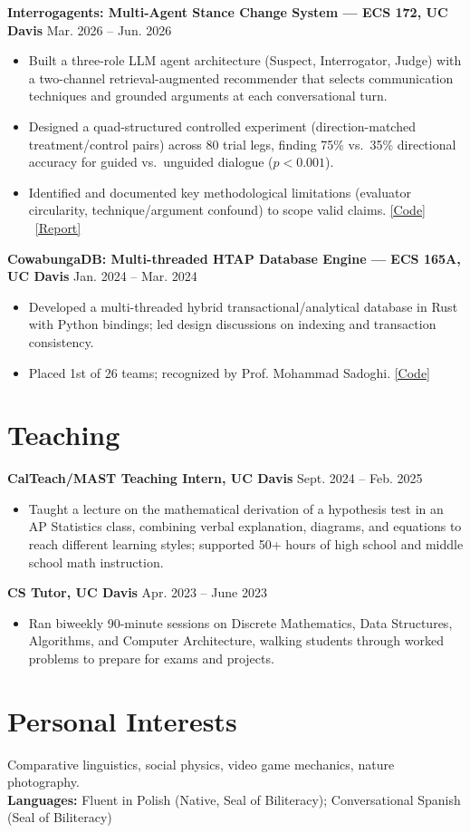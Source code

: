 \documentclass[10.5pt]{article}
\newcommand{\entry}[2]{\textbf{#1} \hfill #2\\}
\begin{document}
\entry{Interrogagents: Multi-Agent Stance Change System --- ECS 172, UC Davis}{Mar. 2026 -- Jun. 2026}
\begin{itemize}
  \item Built a three-role LLM agent architecture (Suspect, Interrogator, Judge) with a two-channel retrieval-augmented recommender that selects communication techniques and grounded arguments at each conversational turn.
  \item Designed a quad-structured controlled experiment (direction-matched treatment/control pairs) across 80 trial legs, finding 75\% vs.\ 35\% directional accuracy for guided vs.\ unguided dialogue ($p < 0.001$).
  \item Identified and documented key methodological limitations (evaluator circularity, technique/argument confound) to scope valid claims. \href{https://github.com/mawroblewski1/interrogating-agents}{[Code]} \textbar\ \href{https://github.com/mawroblewski1/interrogating-agents/blob/main/papers/project_report.pdf}{[Report]}
\end{itemize}

\entry{CowabungaDB: Multi-threaded HTAP Database Engine --- ECS 165A, UC Davis}{Jan. 2024 -- Mar. 2024}
\begin{itemize}
  \item Developed a multi-threaded hybrid transactional/analytical database in Rust with Python bindings; led design discussions on indexing and transaction consistency.
  \item Placed 1st of 26 teams; recognized by Prof. Mohammad Sadoghi. \href{https://github.com/GeorgeBerdovskiy/cowabunga}{[Code]}
\end{itemize}

\section*{Teaching}

\entry{CalTeach/MAST Teaching Intern, UC Davis}{Sept. 2024 -- Feb. 2025}
\begin{itemize}
  \item Taught a lecture on the mathematical derivation of a hypothesis test in an AP Statistics class, combining verbal explanation, diagrams, and equations to reach different learning styles; supported 50+ hours of high school and middle school math instruction.
\end{itemize}

\entry{CS Tutor, UC Davis}{Apr. 2023 -- June 2023}
\begin{itemize}
  \item Ran biweekly 90-minute sessions on Discrete Mathematics, Data Structures, Algorithms, and Computer Architecture, walking students through worked problems to prepare for exams and projects.
\end{itemize}

\section*{Personal Interests}
Comparative linguistics, social physics, video game mechanics, nature photography.\\
\textbf{Languages:} Fluent in Polish (Native, Seal of Biliteracy); Conversational Spanish (Seal of Biliteracy)
\end{document}
